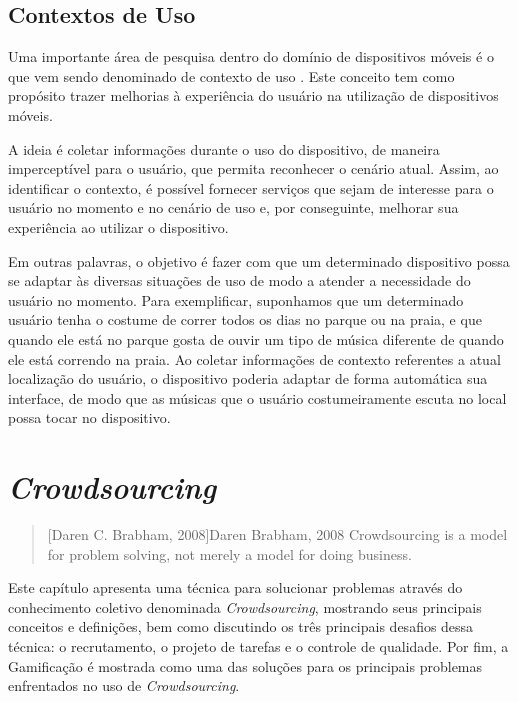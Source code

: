 \section{Contextos de Uso}
\label{sc:contextoDeUso}
Uma importante área de pesquisa dentro do domínio de dispositivos móveis é o que vem sendo denominado de contexto de uso \citep{carmo2012}. Este conceito tem como propósito trazer melhorias à experiência do usuário na utilização de dispositivos móveis.  

A ideia é coletar informações durante o uso do dispositivo, de maneira imperceptível para o usuário, que permita reconhecer o cenário atual.  Assim, ao identificar o contexto, é possível fornecer serviços que sejam de interesse para o usuário no momento e no cenário de uso e, por conseguinte, melhorar  sua experiência ao utilizar o dispositivo.

Em outras palavras, o objetivo é fazer com que um determinado dispositivo possa se adaptar às diversas situações de uso de modo a atender a necessidade do usuário no momento. Para exemplificar, suponhamos que um determinado usuário tenha o costume de correr todos os dias no parque ou na praia, e que quando ele está no parque gosta de ouvir um tipo de música diferente de quando ele está correndo na praia. Ao coletar informações de contexto referentes a atual localização do usuário,  o dispositivo poderia adaptar de forma automática sua interface, de modo que as músicas que o usuário costumeiramente escuta no local possa tocar no dispositivo. 


\chapter{\textit{Crowdsourcing}}
\label{ch:crowdsourcing}

\begin{quotation}[Daren C. Brabham, 2008]{Daren Brabham, 2008}
Crowdsourcing is a model for problem solving, not merely a model for doing business.
\end{quotation}

Este capítulo apresenta uma técnica para solucionar problemas através do conhecimento coletivo denominada \textit{Crowdsourcing}, mostrando seus principais conceitos e definições, bem como discutindo os três principais desafios dessa técnica: o recrutamento, o projeto de tarefas e o controle de qualidade. Por fim, a Gamificação é mostrada como uma das soluções para os principais problemas enfrentados no uso de  \textit{Crowdsourcing}.

